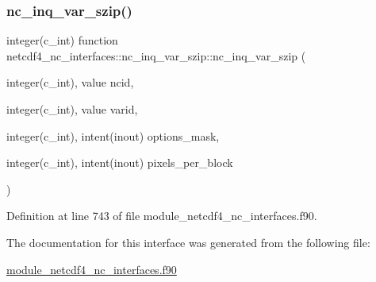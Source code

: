 \subsubsection{\texorpdfstring{nc\+\_\+inq\+\_\+var\+\_\+szip()}{nc\_inq\_var\_szip()}}
{\footnotesize\ttfamily integer(c\+\_\+int) function netcdf4\+\_\+nc\+\_\+interfaces\+::nc\+\_\+inq\+\_\+var\+\_\+szip\+::nc\+\_\+inq\+\_\+var\+\_\+szip (\begin{DoxyParamCaption}\item[{integer(c\+\_\+int), value}]{ncid,  }\item[{integer(c\+\_\+int), value}]{varid,  }\item[{integer(c\+\_\+int), intent(inout)}]{options\+\_\+mask,  }\item[{integer(c\+\_\+int), intent(inout)}]{pixels\+\_\+per\+\_\+block }\end{DoxyParamCaption})}



Definition at line 743 of file module\+\_\+netcdf4\+\_\+nc\+\_\+interfaces.\+f90.



The documentation for this interface was generated from the following file\+:\begin{DoxyCompactItemize}
\item 
\hyperlink{module__netcdf4__nc__interfaces_8f90}{module\+\_\+netcdf4\+\_\+nc\+\_\+interfaces.\+f90}\end{DoxyCompactItemize}
